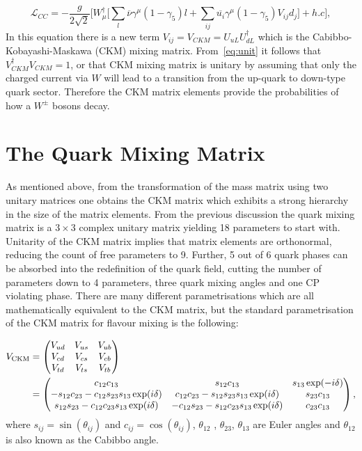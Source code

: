 \begin{equation}
	\mathcal{L}_{CC}= - \frac{g}{2\sqrt{2}}\Big[W^{\dagger}_{\mu}\big[\sum_{l}\overline{\nu}\gamma^{\mu}(1-\gamma_{5})l + \sum_{ij}\overline{u_{i}}\gamma^{\mu}(1-\gamma_{5})V_{ij}d_{j}\big] + h.c\Big], 
\label{eq:LC}
\end{equation}
In this equation there is a new term $V_{ij}=V_{CKM}= U_{uL} U_{dL}^\dag$ which is the Cabibbo-Kobayashi-Maskawa (CKM) mixing matrix. From~\autoref{eq:unit} it follows that $V^{\dagger}_{CKM}V_{CKM}=1$, or that \gls{CKM} mixing matrix is unitary by assuming that only the charged current via $W$ will lead to a transition from the up-quark to down-type quark sector. Therefore the CKM matrix elements provide the probabilities of how a $W^{\pm}$ bosons decay.
 





\section{ The Quark Mixing Matrix}
\label{ckm}
As mentioned above, from the transformation of the mass matrix using two unitary matrices one obtains the \gls{CKM} matrix which exhibits a strong hierarchy in the size of the matrix elements. From the previous discussion the quark mixing matrix is a $3 \times 3$ complex unitary matrix yielding 18 parameters to start with. Unitarity of the \gls{CKM} matrix implies that matrix elements are orthonormal, reducing the count of free parameters to 9. Further, 5 out of 6 quark phases can be absorbed into the redefinition of the quark field, cutting the number of parameters down to 4 parameters, three quark mixing angles and one CP violating phase. There are many different parametrisations which are all mathematically equivalent to the \gls{CKM} matrix, but the standard parametrisation of the \gls{CKM} matrix for flavour mixing is the following:

\begin{align}
V_{\rm CKM} &=  \begin{pmatrix}   V_{ud} & V_{us} & V_{ub} \cr
    V_{cd} & V_{cs} & V_{cb} \cr
    V_{td} & V_{ts} & V_{tb} \cr \end{pmatrix} \\
 &= \begin{pmatrix}c_{12}c_{13}& s_{12}c_{13} & s_{13}\exp(-i\delta) \cr
-s_{12}c_{23}-c_{12}s_{23}s_{13}\exp(i\delta) & c_{12}c_{23}- 
s_{12}s_{23}s_{13}\exp(i\delta) & s_{23}c_{13} \cr 
s_{12}s_{23}- c_{12}c_{23}s_{13}\exp(i\delta) & 
-c_{12}s_{23}-s_{12}c_{23}s_{13}\exp(i\delta) & c_{23}c_{13}\end{pmatrix},
\end{align}
where $s_{ij} = \sin(\theta_{ij})$ and $c_{ij} = \cos(\theta_{ij})$, $\theta_{12}$ , $\theta_{23}$, $\theta_{13}$ are Euler angles and $\theta_{12}$ is also known as the Cabibbo angle.

